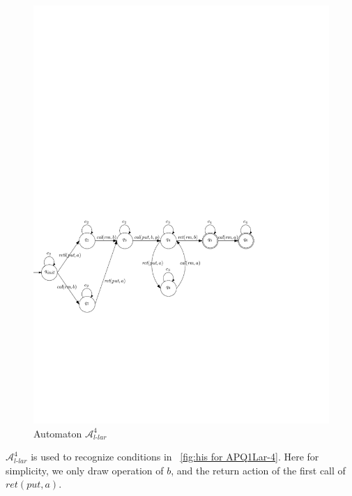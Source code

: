 \begin{figure}[htbp]
  \centering
  \includegraphics[width=0.9 \textwidth]{figures/PIC_AUTO_PQ1Lar-rprp.pdf}
  \caption{Automaton $\mathcal{A}_{\textit{l-lar}}^4$}
  \label{fig:automata APQ1Lar-4}
\end{figure}


$\mathcal{A}_{\textit{l-lar}}^4$ is used to recognize conditions in \figurename~\ref{fig:his for APQ1Lar-4}. Here for simplicity, we only draw operation of $b$, and the return action of the first call of $\textit{ret}(\textit{put},a)$.


